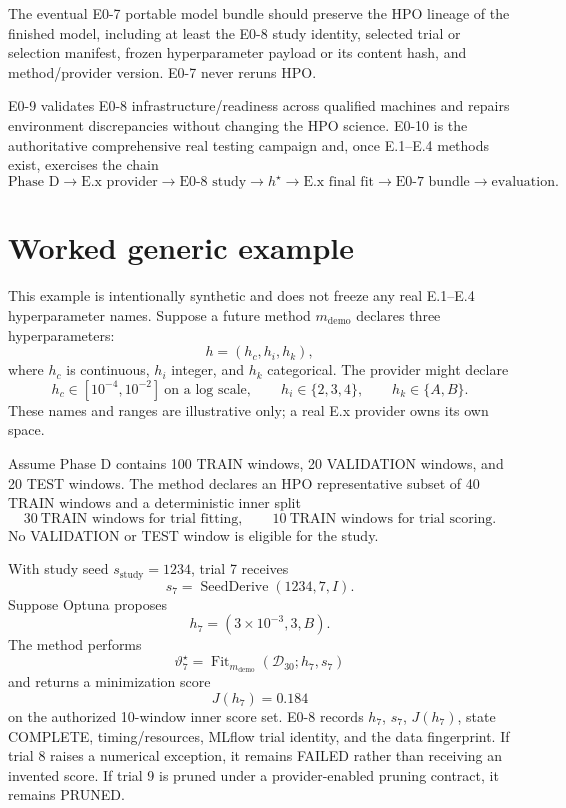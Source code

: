 \documentclass[11pt]{article}
\newcommand{\Data}{\mathcal{D}}
\begin{document}
The eventual E0-7 portable model bundle should preserve the HPO lineage of the
finished model, including at least the E0-8 study identity, selected trial or
selection manifest, frozen hyperparameter payload or its content hash, and
method/provider version. E0-7 never reruns HPO.

E0-9 validates E0-8 infrastructure/readiness across qualified machines and
repairs environment discrepancies without changing the HPO science. E0-10 is
the authoritative comprehensive real testing campaign and, once E.1--E.4
methods exist, exercises the chain
\[
\boxed{
\text{Phase D}
\rightarrow
\text{E.x provider}
\rightarrow
\text{E0-8 study}
\rightarrow
h^{\star}
\rightarrow
\text{E.x final fit}
\rightarrow
\text{E0-7 bundle}
\rightarrow
\text{evaluation}.
}
\]

\section{Worked generic example}

This example is intentionally synthetic and does not freeze any real E.1--E.4
hyperparameter names. Suppose a future method $m_{\mathrm{demo}}$ declares
three hyperparameters:
\[
h=(h_c,h_i,h_k),
\]
where $h_c$ is continuous, $h_i$ integer, and $h_k$ categorical. The provider
might declare
\[
h_c\in[10^{-4},10^{-2}]\ \text{on a log scale},\qquad
h_i\in\{2,3,4\},\qquad
h_k\in\{A,B\}.
\]
These names and ranges are illustrative only; a real E.x provider owns its own
space.

Assume Phase D contains 100 TRAIN windows, 20 VALIDATION windows, and 20 TEST
windows. The method declares an HPO representative subset of 40 TRAIN windows
and a deterministic inner split
\[
30\ \text{TRAIN windows for trial fitting},\qquad
10\ \text{TRAIN windows for trial scoring}.
\]
No VALIDATION or TEST window is eligible for the study.

With study seed $s_{\mathrm{study}}=1234$, trial 7 receives
\[
s_7=\operatorname{SeedDerive}(1234,7,I).
\]
Suppose Optuna proposes
\[
h_7=(3\times10^{-3},3,B).
\]
The method performs
\[
\vartheta_7^{\star}
=\operatorname{Fit}_{m_{\mathrm{demo}}}(\Data_{30};h_7,s_7)
\]
and returns a minimization score
\[
J(h_7)=0.184
\]
on the authorized 10-window inner score set. E0-8 records $h_7$, $s_7$,
$J(h_7)$, state COMPLETE, timing/resources, MLflow trial identity, and the data
fingerprint. If trial 8 raises a numerical exception, it remains FAILED rather
than receiving an invented score. If trial 9 is pruned under a provider-enabled
pruning contract, it remains PRUNED.
\end{document}
